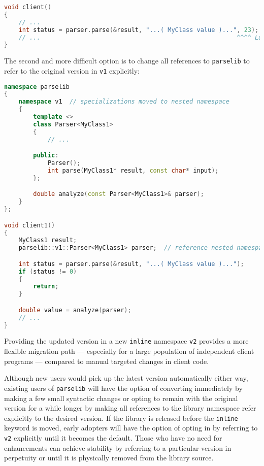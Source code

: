 \begin{lstlisting}[language=C++]
void client()
{
    // ...
    int status = parser.parse(&result, "...( MyClass value )...", 23);
    // ...                                                      ^^^^ Look here!
}
\end{lstlisting}

\noindent The second and more difficult option is to change all references to
\texttt{parselib} to refer to the original version in \texttt{v1}
explicitly:

\begin{lstlisting}[language=C++]
namespace parselib
{
    namespace v1  // specializations moved to nested namespace
    {
        template <>
        class Parser<MyClass1>
        {
            // ...

        public:
            Parser();
            int parse(MyClass1* result, const char* input);
        };

        double analyze(const Parser<MyClass1>& parser);
    }
};

void client1()
{
    MyClass1 result;
    parselib::v1::Parser<MyClass1> parser;  // reference nested namespace (ù{\codeincomments{v1}}ù)

    int status = parser.parse(&result, "...( MyClass value )...");
    if (status != 0)
    {
        return;
    }

    double value = analyze(parser);
    // ...
}
\end{lstlisting}

\noindent Providing the updated version in a new \texttt{inline} namespace
\texttt{v2} provides a more flexible migration path --- especially for a
large population of independent client programs --- compared to manual
targeted changes in client code.

Although new users would pick up the latest version automatically either
way, existing users of \texttt{parselib} will have the option of
converting immediately by making a few small syntactic changes or
opting to remain with the original version for a while longer by making
all references to the library namespace refer explicitly to the desired
version. If the library is released before the \texttt{inline} keyword
is moved, early adopters will have the option of opting in by referring
to \texttt{v2} explicitly until it becomes the default. Those who have
no need for enhancements can achieve stability by referring to a
particular version in perpetuity or until it is physically removed from
the library source.


